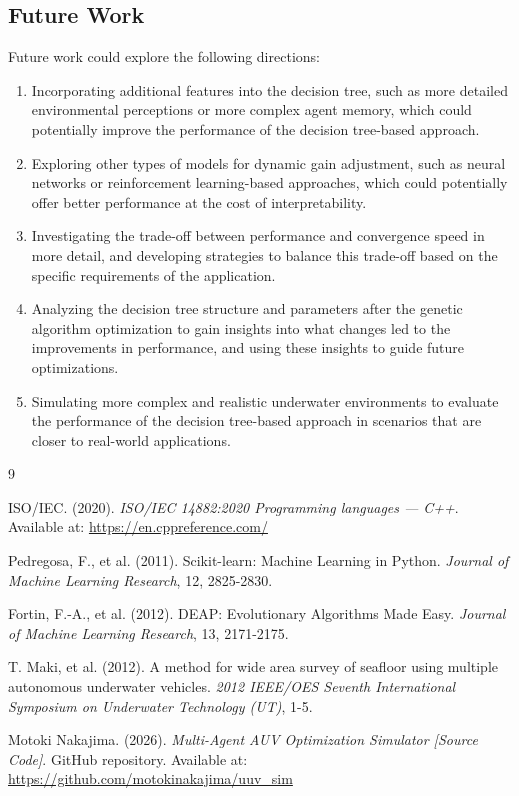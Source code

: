 \documentclass[11pt]{article}
\begin{document}
\subsection{Future Work}
Future work could explore the following directions:
\begin{enumerate}
    \item Incorporating additional features into the decision tree, such as more detailed environmental perceptions or more complex agent memory, which could potentially improve the performance of the decision tree-based approach.
    \item Exploring other types of models for dynamic gain adjustment, such as neural networks or reinforcement learning-based approaches, which could potentially offer better performance at the cost of interpretability.
    \item Investigating the trade-off between performance and convergence speed in more detail, and developing strategies to balance this trade-off based on the specific requirements of the application.
    \item Analyzing the decision tree structure and parameters after the genetic algorithm optimization to gain insights into what changes led to the improvements in performance, and using these insights to guide future optimizations.
    \item Simulating more complex and realistic underwater environments to evaluate the performance of the decision tree-based approach in scenarios that are closer to real-world applications.
\end{enumerate}

\begin{thebibliography}{9}

ISO/IEC. (2020). \emph{ISO/IEC 14882:2020 Programming languages — C++}. 
Available at: \url{https://en.cppreference.com/}

Pedregosa, F., et al. (2011). Scikit-learn: Machine Learning in Python. 
\emph{Journal of Machine Learning Research}, 12, 2825-2830.

Fortin, F.-A., et al. (2012). DEAP: Evolutionary Algorithms Made Easy. 
\emph{Journal of Machine Learning Research}, 13, 2171-2175.

T. Maki, et al. (2012). A method for wide area survey of seafloor using multiple autonomous underwater vehicles. 
\emph{2012 IEEE/OES Seventh International Symposium on Underwater Technology (UT)}, 1-5.

Motoki Nakajima. (2026). \emph{Multi-Agent AUV Optimization Simulator [Source Code]}. 
GitHub repository. Available at: \url{https://github.com/motokinakajima/uuv_sim}

\end{thebibliography}
\end{document}
